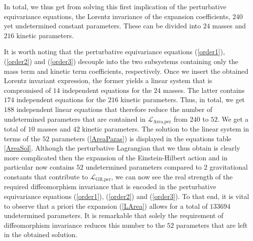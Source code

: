 In total, we thus get from solving this first implication of the perturbative equivariance equations, the Lorentz invariance of the expansion coefficients, $240$ yet undetermined constant parameters. These can be divided into $24$ masses and $216$ kinetic parameters.

It is worth noting that the perturbative equivariance equations (\ref{order1}), (\ref{order2}) and (\ref{order3}) decouple into the two subsystems containing only the mass term and kinetic term coefficients, respectively. Once we insert the obtained Lorentz invariant expression, the former yields a linear system that is compromised of $14$ independent equations for the $24$ masses. The latter contains $174$ independent equations for the $216$ kinetic parameters. Thus, in total, we get $188$ independent linear equations that therefore reduce the number of undetermined parameters that are contained in $\mathcal{L}_{\text{Area,per}}$ from $240$ to $52$. We get a total of $10$ masses and $42$ kinetic parameters. The solution to the linear system in terms of the $52$ parameters (\ref{AreaParas}) is displayed in the equations table \ref{AreaSol}. Although the perturbative Lagrangian that we thus obtain is clearly more complicated then the expansion of the Einstein-Hilbert action and in particular now contains $52$ undetermined parameters compared to $2$ gravitational constants that contribute to $\mathcal{L}_{\text{GR,per}}$, we can now see the real strength of the required diffeomorphism invariance that is encoded in the perturbative equivariance equations (\ref{order1}), (\ref{order2}) and (\ref{order3}). To that end, it is vital to observe that a priori the expansion (\ref{LArea}) allows for a total of $133694$ undetermined parameters. It is remarkable that solely the requirement of diffeomorphism invariance reduces this number to the $52$ parameters that are left in the obtained solution. 

